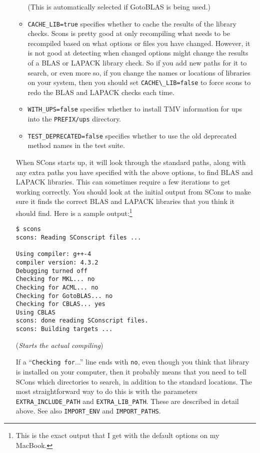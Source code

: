 \documentclass[twoside,letterpaper,11pt]{article}
\renewcommand{\tt}[1]{{\lstinline {#1}}}
\begin{document}
\begin{enumerate}
\begin{itemize}
(This is automatically selected if GotoBLAS is being used.)
\item \texttt{CACHE\_LIB=true} specifies whether to cache the results of the library checks.  
Scons is pretty good at only recompiling what needs to be recompiled based on what options or files you have changed.  However, it is not good at detecting when changed options might change the results of a BLAS or LAPACK library check.  So if you add new paths for it to search, or even more so, if you change the names or locations of libraries on your system, then you should set \tt{CACHE\_LIB=false} to force scons to redo the BLAS and LAPACK checks each time.
\item \texttt{WITH\_UPS=false} specifies whether to install TMV information for ups into the \tt{PREFIX/ups} directory.
\item \texttt{TEST\_DEPRECATED=false} specifies whether to use the old deprecated method
names in the test suite.
\end{itemize}

When SCons starts up, it will look through the standard paths, along with any extra paths you have
specified with the above options, to find BLAS
and LAPACK libraries.  This can sometimes require a few iterations to get working correctly.  
You should look at the initial output from SCons to make sure it finds the correct BLAS
and LAPACK libraries that you think it should find.  Here is a sample output:\footnote{
This is the exact output that I get with the default options on my MacBook.}
\begin{verbatim}
$ scons
scons: Reading SConscript files ...

Using compiler: g++-4
compiler version: 4.3.2
Debugging turned off
Checking for MKL... no
Checking for ACML... no
Checking for GotoBLAS... no
Checking for CBLAS... yes
Using CBLAS
scons: done reading SConscript files.
scons: Building targets ...
\end{verbatim}
\vspace{-8pt}(\emph{Starts the actual compiling})

If a ``\texttt{Checking for}...'' line ends with \texttt{no}, even though you think that library is installed
on your computer, then it probably means that you need to tell SCons which directories
to search, in addition to the standard locations.  The most straightforward way to do this is
with the parameters \texttt{EXTRA\_INCLUDE\_PATH} and \texttt{EXTRA\_LIB\_PATH}.  
These are described in detail above.  See also \texttt{IMPORT\_ENV} and \texttt{IMPORT\_PATHS}.


\end{enumerate}
\end{document}
